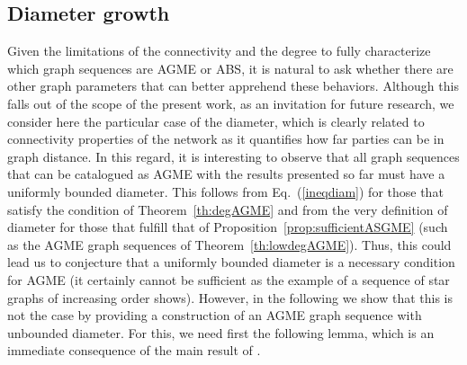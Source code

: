 \documentclass[a4paper,onecolumn,accepted=2024-12-14]{quantumarticle}
\theoremstyle{plain}
\begin{document}
\subsection{Diameter growth}\label{sec:diameter}

Given the limitations of the connectivity and the degree to fully characterize which graph sequences are AGME or ABS, it is natural to ask whether there are other graph parameters that can better apprehend these behaviors. Although this falls out of the scope of the present work, as an invitation for future research, we consider here the particular case of the diameter, which is clearly related to connectivity properties of the network as it quantifies how far parties can be in graph distance. In this regard, it is interesting to observe that all graph sequences that can be catalogued as AGME with the results presented so far must have a uniformly bounded diameter. This follows from Eq.~(\ref{ineqdiam}) for those that satisfy the condition of Theorem~\ref{th:degAGME} and from the very definition of diameter for those that fulfill that of Proposition~\ref{prop:sufficientASGME} (such as the AGME graph sequences of Theorem~\ref{th:lowdegAGME}). Thus, this could lead us to conjecture that a uniformly bounded diameter is a necessary condition for AGME (it certainly cannot be sufficient as the example of a sequence of star graphs of increasing order shows). However, in the following we show that this is not the case by providing a construction of an AGME graph sequence with unbounded diameter. For this, we need first the following lemma, which is an immediate consequence of the main result of \cite{beigi}.
\end{document}
